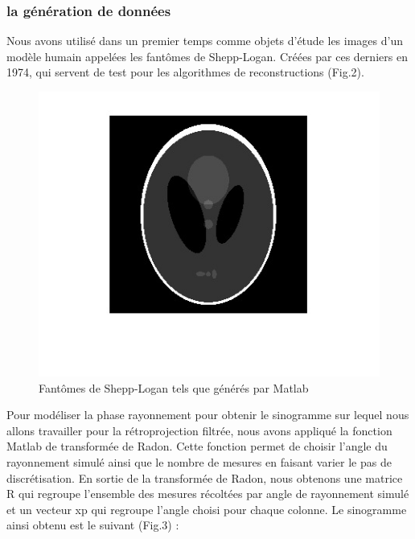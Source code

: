 \documentclass[conference]{IEEEtran}
\begin{document}
\subsubsection{la génération de données }

Nous avons utilisé dans un premier temps comme objets d'étude les images d'un modèle humain appelées les fantômes de Shepp-Logan. Créées par ces derniers en 1974, qui servent de test pour les algorithmes de reconstructions (Fig.2).

\begin{figure}[H]
\centering
\includegraphics[scale=0.7]{Shepp-logan}
\caption[Fantômes de Shepp-Logan tels que générés par Matlab]{Fantômes de Shepp-Logan tels que générés par Matlab}
\label{fig:gallery}
\end{figure}

Pour modéliser la phase rayonnement pour obtenir le sinogramme sur lequel nous allons travailler pour la rétroprojection filtrée, nous avons appliqué la fonction Matlab de transformée de Radon. Cette fonction permet de choisir l'angle du rayonnement simulé ainsi que le nombre de mesures en faisant varier le pas de discrétisation.
En sortie de la transformée de Radon, nous obtenons une matrice R qui regroupe l'ensemble des mesures récoltées par angle de rayonnement simulé et un vecteur xp qui regroupe l'angle choisi pour chaque colonne. Le sinogramme ainsi obtenu est le suivant (Fig.3) :
\end{document}
